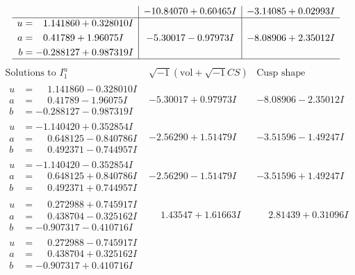 \documentclass[1p]{elsarticle_modified}
\theoremstyle{definition}
\newcommand{\I}{\sqrt{-1}}
\begin{document}
$$\begin{array}{c|c|c}
 & -10.84070 + 0.60465 I & -3.14085 + 0.02993 I \\ \hline\begin{aligned}
u &= \phantom{-}1.141860 + 0.328010 I \\
a &= \phantom{-}0.41789 + 1.96075 I \\
b &= -0.288127 + 0.987319 I\end{aligned}
 & -5.30017 - 0.97973 I & -8.08906 + 2.35012 I\\
 \hline 
 \end{array}$$\newpage$$\begin{array}{c|c|c}  
\text{Solutions to }I^u_{1}& \I (\text{vol} + \sqrt{-1}CS) & \text{Cusp shape}\\
 \hline 
\begin{aligned}
u &= \phantom{-}1.141860 - 0.328010 I \\
a &= \phantom{-}0.41789 - 1.96075 I \\
b &= -0.288127 - 0.987319 I\end{aligned}
 & -5.30017 + 0.97973 I & -8.08906 - 2.35012 I \\ \hline\begin{aligned}
u &= -1.140420 + 0.352854 I \\
a &= \phantom{-}0.648125 - 0.840786 I \\
b &= \phantom{-}0.492371 - 0.744957 I\end{aligned}
 & -2.56290 + 1.51479 I & -3.51596 - 1.49247 I \\ \hline\begin{aligned}
u &= -1.140420 - 0.352854 I \\
a &= \phantom{-}0.648125 + 0.840786 I \\
b &= \phantom{-}0.492371 + 0.744957 I\end{aligned}
 & -2.56290 - 1.51479 I & -3.51596 + 1.49247 I \\ \hline\begin{aligned}
u &= \phantom{-}0.272988 + 0.745917 I \\
a &= \phantom{-}0.438704 - 0.325162 I \\
b &= -0.907317 - 0.410716 I\end{aligned}
 & \phantom{-}1.43547 + 1.61663 I & \phantom{-}2.81439 + 0.31096 I \\ \hline\begin{aligned}
u &= \phantom{-}0.272988 - 0.745917 I \\
a &= \phantom{-}0.438704 + 0.325162 I \\
b &= -0.907317 + 0.410716 I\end{aligned}

\end{array}$$
\end{document}
